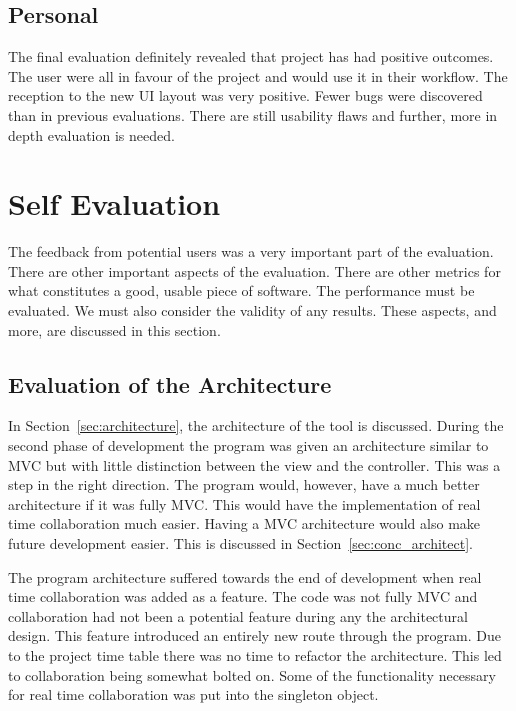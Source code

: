 \subsection{Personal}

The final evaluation definitely revealed that project has had positive outcomes.  The user were all in favour of the project and would use it in their workflow.  The reception to the new \ac{UI} layout was very positive.  Fewer bugs were discovered than in previous evaluations. There are still usability flaws and further, more in depth evaluation is needed.

\section{Self Evaluation}
The feedback from potential users was a very important part of the evaluation.  There are other important aspects of the evaluation.  There are other metrics for what constitutes a good, usable piece of software.  The performance must be evaluated.  We must also consider the validity of any results.  These aspects, and more, are discussed in this section.


\subsection{Evaluation of the Architecture}

In Section~\ref{sec:architecture}, the architecture of the tool is discussed.  During the second phase of development the program was given an architecture similar to \ac{MVC} but with little distinction between the view and the controller.  This was a step in the right direction.  The program would, however, have a much better architecture if it was fully \ac{MVC}.  This would have the implementation of real time collaboration much easier. Having a \ac{MVC} architecture would also make future development easier.  This is discussed in Section~\ref{sec:conc_architect}.

The program architecture suffered towards the end of development when real time collaboration was added as a feature.  The code was not fully \ac{MVC} and collaboration had not been a potential feature during any the architectural design.  This feature introduced an entirely new route through the program.  Due to the project time table there was no time to refactor the architecture.  This led to collaboration being somewhat bolted on.  Some of the functionality necessary for real time collaboration was put into the singleton object.

